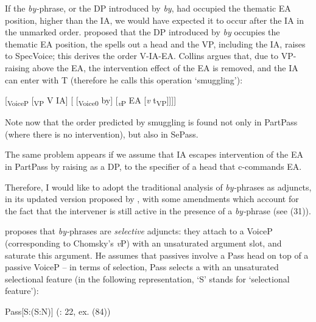\documentclass[output=paper]{langsci/langscibook}
\begin{document}
If the \textit{by-}phrase, or the DP introduced by \textit{by}, had occupied the thematic EA position, higher than the IA, we would have expected it to occur after the IA in the unmarked order. \citet{Collins2005} proposed that the DP introduced by \textit{by} occupies the thematic EA position, the  spells out a head  and the VP, including the IA, raises to SpecVoice; this derives the order V-IA-EA. Collins argues that, due to VP-raising above the EA, the intervention effect of the EA is removed, and the IA can enter  with T (therefore he calls this operation ‘smuggling'):

\ea%
    \label{ex:giurgea:30}
    [\textsubscript{VoiceP}  [\textsubscript{VP} V IA] [ [\textsubscript{Voice0}  by] [\textit{\textsubscript{v}}\textsubscript{P} EA [\textit{v} t\textsubscript{VP}]]]]
    \z

Note now that the order predicted by smuggling is found not only in PartPass (where there is no intervention), but also in SePass. 

  The same problem appears if we assume that IA escapes intervention of the EA in PartPass by raising as a DP, to the specifier of a head that c-commands EA.

  Therefore, I would like to adopt the traditional analysis of \textit{by-}phrases as adjuncts, in its updated version proposed by \citet{Bruening2012}, with some amendments which account for the fact that the intervener is still active in the presence of a \textit{by-}phrase (see (31)).

    \z

\citet{Bruening2012} proposes that \textit{by-}phrases are \textit{selective} adjuncts: they attach to a VoiceP (corresponding to Chomsky’s \textit{v}P) with an unsaturated argument slot, and saturate this argument. He assumes that passives involve a Pass head on top of a passive VoiceP – in terms of selection, Pass selects a  with an unsaturated selectional feature (in the following representation, ‘S' stands for ‘selectional feature'):

\ea%
    \label{ex:giurgea:32}
    Pass[S:(S:N)]  (\citealt{Bruening2012}: 22, ex. (84))
\z
\end{document}
